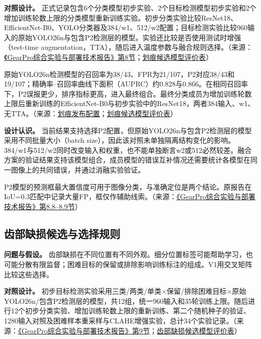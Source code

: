 \textbf{对照设计。} 正式记录包含6个分类模型初步实验、2个目标检测模型初步实验和2个增加训练轮数上限的分类模型重新训练实验。初步分类实验比较ResNet18、EfficientNet-B0、YOLO分类器及384/w1、512/w2配置；目标检测实验比较960输入的原始YOLO26n与包含P2检测层的模型。实验还比较是否使用测试时增强（test-time augmentation，TTA），随后进入温度参数与融合规则选择。（来源：\protect\href{run:../GearPro_综合技术报告_Markdown含配图/GearPro_综合实验与部署技术报告.md}{《GearPro综合实验与部署技术报告》第8节}；\protect\hyperlink{source-7}{划痕候选模型评价表}）

原始YOLO26n检测模型的召回率为38/43、FPR为21/107，P2对应38/43和19/107；精确率--召回率曲线下面积（AUPRC）约0.828与0.866。在相同召回率下，P2误报更少，排序指标更高，进入最终组合。最终分类成员为增加训练轮数上限后重新训练的EfficientNet-B0与初步实验中的ResNet18，两者384输入、w1、无TTA。（来源：\protect\hyperlink{source-1}{划痕发布配置}；\protect\hyperlink{source-7}{划痕候选模型评价表}）

\textbf{设计认识。} 当前结果支持选择P2配置，但原始YOLO26n与包含P2检测层的模型采用不同批量大小（batch size），因此该对照未单独隔离结构变化的影响。384/w1与512/w2同时改变输入和权重，也不能单独断言w2或512必然较差。融合方案的验证结果支持该模型组合，成员模型的错误互补情况还需要统计各模型在同一图像上的共同错误，并通过消融实验验证。

P2模型的预测框最大置信度可用于图像分类，与准确定位是两个结论。原报告在IoU=0.3匹配中记录大量FP，框仅作辅助线索。（来源：\protect\href{run:../GearPro_综合技术报告_Markdown含配图/GearPro_综合实验与部署技术报告.md}{《GearPro综合实验与部署技术报告》第8.8--8.9节}）

\FloatBarrier{}\subsection{齿部缺损候选与选择规则}
\textbf{问题与假设。} 齿部缺损在不同位置有不同外观。细分位置标签可能帮助学习，也可能分散有限监督；困难目标的保留或排除影响训练标注的组成。V1用交叉矩阵比较这些选择。

\textbf{对照设计。} 初步目标检测实验采用三类/两类/单类\ensuremath{\times}保留/排除困难目标\ensuremath{\times}原始YOLO26n/包含P2检测层的模型，共12组，统一960输入和35轮训练上限。随后进行12个初步分类实验、增加训练轮数上限的重新训练、第二个随机种子的验证、1280输入对照及困难样本重采样与CLAHE增强实验，总计34个实验记录。（来源：\protect\href{run:../GearPro_综合技术报告_Markdown含配图/GearPro_综合实验与部署技术报告.md}{《GearPro综合实验与部署技术报告》第9节}；\protect\hyperlink{source-8}{齿部缺损候选模型评价表}）

